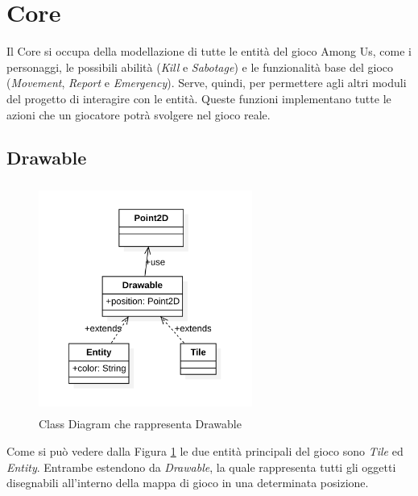 \section{Core}
Il Core si occupa della modellazione di tutte le entit\`a del gioco Among Us, come i personaggi, le possibili abilit\`a (\textit{Kill} e \textit{Sabotage}) e le funzionalit\`a base del gioco (\textit{Movement}, \textit{Report} e \textit{Emergency}). Serve, quindi, per permettere agli altri moduli del progetto di interagire con le entit\`a. Queste funzioni implementano tutte le azioni che un giocatore potr\`a svolgere nel gioco reale.

\subsection{Drawable}
\begin{figure}[ht]
\centering
\includegraphics[width=7cm, height=7.5cm]{img/drawable.png}
\caption{Class Diagram che rappresenta Drawable}
\label{fig:ClasDiagRaprDraw}
\end{figure}

Come si può vedere dalla Figura \ref{fig:ClasDiagRaprDraw} le due entit\`a principali del gioco sono \textit{Tile} ed \textit{Entity}. Entrambe estendono da \textit{Drawable}, la quale rappresenta tutti gli oggetti disegnabili all'interno della mappa di gioco in una determinata posizione. 

